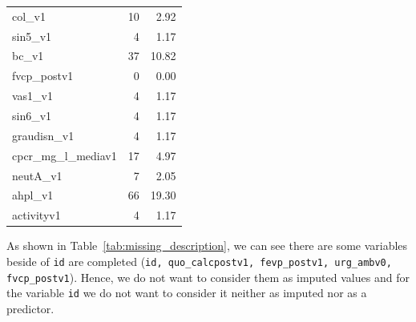 \documentclass[10pt,a4paper,twoside]{article}\usepackage[]{graphicx}\usepackage[]{xcolor}
\begin{document}
\begin{table}[H]
\begin{tabular}{lrr}
  col\_v1 & 10 & 2.92 \\ 
  sin5\_v1 & 4 & 1.17 \\ 
  bc\_v1 & 37 & 10.82 \\ 
  fvcp\_postv1 & 0 & 0.00 \\ 
  vas1\_v1 & 4 & 1.17 \\ 
  sin6\_v1 & 4 & 1.17 \\ 
  graudisn\_v1 & 4 & 1.17 \\ 
  cpcr\_mg\_l\_mediav1 & 17 & 4.97 \\ 
  neutA\_v1 & 7 & 2.05 \\ 
  ahpl\_v1 & 66 & 19.30 \\ 
  activityv1 & 4 & 1.17 \\ 
   \hline
\end{tabular}
\end{table}


As shown in Table~\ref{tab:missing_description}, we can see there are some variables beside of \texttt{id} are completed (\texttt{id, quo\_calcpostv1, fevp\_postv1, urg\_ambv0, fvcp\_postv1}). Hence, we do not want to consider them as imputed values and for the variable \texttt{id} we do not want to consider it neither as imputed nor as a predictor.\\
\end{document}
